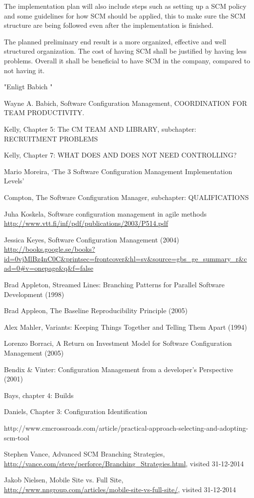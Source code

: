 \documentclass[10pt]{article}
\begin{document}
\noindent The implementation plan will also include steps such as setting up a SCM policy and some guidelines for how SCM should be applied, this to make sure the SCM structure are being followed even after the implementation is finished.

\noindent The planned preliminary end result is a more organized, effective and well structured organization. The cost of having SCM shall be justified by having less problems. Overall it shall be beneficial to have SCM in the company, compared to not having it.


"Enligt Babich \cite{Babich}"


\begin{thebibliography}{1}

 Wayne A. Babich, Software Configuration Management, COORDINATION FOR TEAM PRODUCTIVITY.

 Kelly, Chapter 5: The CM TEAM AND LIBRARY, subchapter: RECRUITMENT PROBLEMS 

 Kelly, Chapter 7: WHAT DOES AND DOES NOT NEED CONTROLLING? 

 Mario Moreira, ‘The 3 Software Configuration Management Implementation Levels’

Compton, The Software Configuration Manager, subchapter: QUALIFICATIONS

Juha Koskela, Software configuration management in agile methods
\url{http://www.vtt.fi/inf/pdf/publications/2003/P514.pdf}

 Jessica Keyes, Software Configuration Management (2004) \url{http://books.google.se/books?id=0vjMlBz4nC0C&printsec=frontcover&hl=sv&source=gbs_ge_summary_r&cad=0#v=onepage&q&f=false}

 Brad Appleton, Streamed Lines: Branching Patterns for Parallel Software Development (1998)

 Brad Appleon, The Baseline Reproducibility Principle (2005)

 Alex Mahler, Variants: Keeping Things Together and Telling Them Apart (1994)

 Lorenzo Borraci, A Return on Investment Model for Software Configuration Management (2005)

 Bendix \& Vinter: Configuration Management from a developer's Perspective (2001)

 Bays, chapter 4: Builds

 Daniels, Chapter 3: Configuration Identification

 http://www.cmcrossroads.com/article/practical-approach-selecting-and-adopting-scm-tool

 Stephen Vance, Advanced SCM Branching Strategies, \url{http://vance.com/steve/perforce/Branching_Strategies.html}, visited 31-12-2014

 Jakob Nielsen, Mobile Site vs. Full Site, \url{http://www.nngroup.com/articles/mobile-site-vs-full-site/}, visited 31-12-2014

\end{thebibliography}
\end{document}

